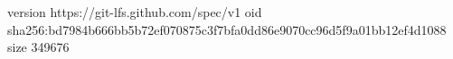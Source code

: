 version https://git-lfs.github.com/spec/v1
oid sha256:bd7984b666bb5b72ef070875c3f7bfa0dd86e9070cc96d5f9a01bb12ef4d1088
size 349676
